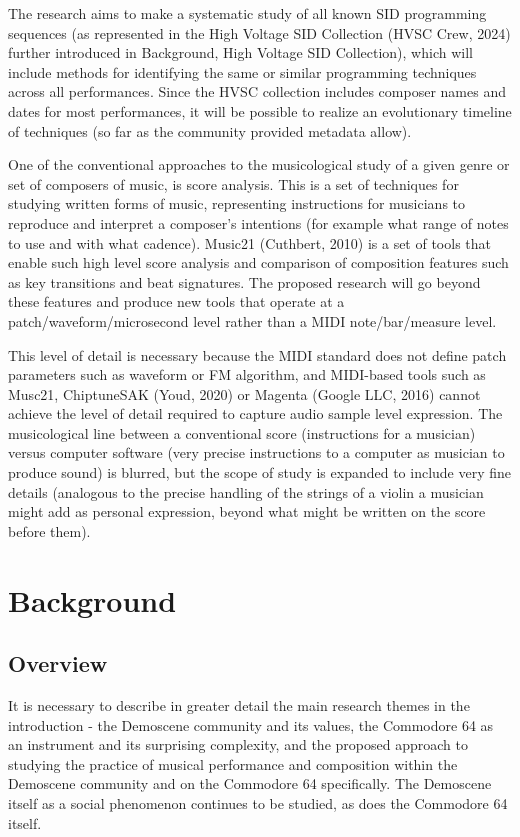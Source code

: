 \documentclass[10pt]{article}
\begin{document}
\begin{multicols*}{2}
The research aims to make a systematic study of all known SID programming sequences (as represented in the High Voltage SID Collection (HVSC Crew, 2024) further introduced in Background, High Voltage SID Collection), which will include methods for identifying the same or similar programming techniques across all performances. Since the HVSC collection includes composer names and dates for most performances, it will be possible to realize an evolutionary timeline of techniques (so far as the community provided metadata allow).

One of the conventional approaches to the musicological study of a given genre or set of composers of music, is score analysis. This is a set of techniques for studying written forms of music, representing instructions for musicians to reproduce and interpret a composer’s intentions (for example what range of notes to use and with what cadence). Music21 (Cuthbert, 2010) is a set of tools that enable such high level score analysis and comparison of composition features such as key transitions and beat signatures. The proposed research will go beyond these features and produce new tools that operate at a patch/waveform/microsecond level rather than a MIDI note/bar/measure level.

This level of detail is necessary because the MIDI standard does not define patch parameters such as waveform or FM algorithm, and MIDI-based tools such as Musc21, ChiptuneSAK (Youd, 2020) or Magenta (Google LLC, 2016) cannot achieve the level of detail required to capture audio sample level expression. The musicological line between a conventional score (instructions for a musician) versus computer software (very precise instructions to a computer as musician to produce sound) is blurred, but the scope of study is expanded to include very fine details (analogous to the precise handling of the strings of a violin a musician might add as personal expression, beyond what might be written on the score before them).

  \section{Background}

  \subsection{Overview}
It is necessary to describe in greater detail the main research themes in the introduction - the Demoscene community and its values, the Commodore 64 as an instrument and its surprising complexity, and the proposed approach to studying the practice of musical performance and composition within the Demoscene community and on the Commodore 64 specifically. The Demoscene itself as a social phenomenon continues to be studied, as does the Commodore 64 itself.


\end{multicols*}
\end{document}

